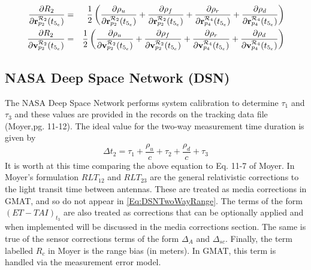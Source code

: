 \begin{eqnarray}
    \frac{\partial R_2}{\partial \mathbf{r}^{\mcR_2}_{p_2}(t_{5_e})} & = & \frac{1}{2}\left(
    \frac{\partial \rho_{u}}{\partial \mathbf{r}^{\mcR_2}_{p_2}(t_{5_e})} +
    \frac{\partial \rho_{f}}{\partial \mathbf{r}^{\mcR_2}_{p_2}(t_{5_e})} +
    \frac{\partial \rho_{r}}{\partial \mathbf{r}^{\mcR_4}_{p_4}(t_{5_e})} +
    \frac{\partial \rho_{d}}{\partial \mathbf{r}^{\mcR_4}_{p_4}(t_{5_e})}\right)\\
    \frac{\partial R_2}{\partial \mathbf{v}^{\mcR_2}_{p_2}(t_{5_e})} & = & \frac{1}{2}\left(
    \frac{\partial \rho_{u}}{\partial \mathbf{v}^{\mcR_2}_{p_2}(t_{5_e})} +
    \frac{\partial \rho_{f}}{\partial \mathbf{v}^{\mcR_2}_{p_2}(t_{5_e})} +
    \frac{\partial \rho_{r}}{\partial \mathbf{v}^{\mcR_4}_{p_4}(t_{5_e})} +
    \frac{\partial \rho_{d}}{\partial \mathbf{v}^{\mcR_4}_{p_4}(t_{5_e})}\right)\\
\end{eqnarray}
\subsection{NASA Deep Space Network (DSN)} \label{Sec:DSNTwoWayRange}

The NASA Deep Space Network performs system calibration to determine $\tau_1$ and $\tau_3$ and these values are provided in the records on the tracking data file (Moyer\cite{Moyer},pg. 11-12).  The ideal value for the two-way measurement time duration is given by
%
\begin{equation}
   \Delta t_2 =  \tau_1 + \frac{\rho_{u}}{c} + \tau_2 + \frac{\rho_{d}}{c} + \tau_3 \label{Eq:DSNTwoWayRange}
\end{equation}
%
It is worth at this time comparing the above equation to Eq. 11-7 of Moyer.  In Moyer's formulation $RLT_{12}$ and $RLT_{23}$ are the general relativistic corrections to the light transit time between antennas.  These are treated as media corrections in GMAT, and so do not appear in \ref{Eq:DSNTwoWayRange}.  The terms of the form $(ET - TAI)_{t_3}$ are also treated as corrections that can be optionally applied and when implemented will be discussed in the media corrections section.  The same is true of the sensor corrections terms of the form $\Delta_A$ and $\Delta_{sc}$.  Finally, the term labelled $R_c$ in Moyer is the range bias (in meters).  In GMAT, this term is handled via the measurement error model.


